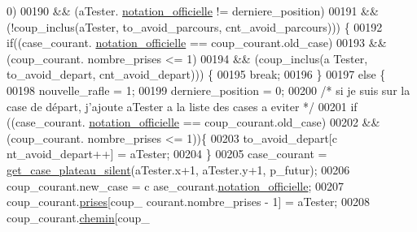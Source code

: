 \begin{DoxyCode}
       0)
00190                                                         && (aTester.
      \hyperlink{structcase__plateau_ad510581b324604a9cf685cbb769a421a}{notation_officielle} != derniere\_position)
00191                                                         && (!coup\_inclus(aTester,
       to\_avoid\_parcours, cnt\_avoid\_parcours))) \{
00192                                                 \textcolor{keywordflow}{if}((case\_courant.
      \hyperlink{structcase__plateau_ad510581b324604a9cf685cbb769a421a}{notation_officielle} == coup\_courant.old\_case)
00193                                                                 && (coup\_courant.
      nombre\_prises <= 1)
00194                                                                 && (coup\_inclus(a
      Tester, to\_avoid\_depart, cnt\_avoid\_depart))) \{
00195                                                         \textcolor{keywordflow}{break};
00196                                                 \}
00197                                                 \textcolor{keywordflow}{else} \{
00198                                                         nouvelle\_rafle = 1;
00199                                                         derniere\_position = 0;
00200                                                         \textcolor{comment}{/* si je suis sur la case
       de départ, j'ajoute aTester a la liste des cases a eviter */}
00201                                                         \textcolor{keywordflow}{if} ((case\_courant.
      \hyperlink{structcase__plateau_ad510581b324604a9cf685cbb769a421a}{notation_officielle} == coup\_courant.old\_case)
00202                                                                 && (coup\_courant.
      nombre\_prises <= 1))\{
00203                                                                 to\_avoid\_depart[c
      nt\_avoid\_depart++] = aTester;
00204                                                         \}
00205                                                         case\_courant = 
      \hyperlink{plateau_8h_a60a8f706865d0ae9087f8d65d4667655}{get_case_plateau_silent}(aTester.x+1, aTester.y+1, p\_futur);
00206                                                         coup\_courant.new\_case = c
      ase\_courant.\hyperlink{structcase__plateau_ad510581b324604a9cf685cbb769a421a}{notation_officielle};
00207                                                         coup\_courant.\hyperlink{structcoup_ae19b3a66d3f4e66b8f69a38e4005f44a}{prises}[coup\_
      courant.nombre\_prises - 1] = aTester;
00208                                                         coup\_courant.\hyperlink{structcoup_aa66b88eb8140c2f459ac92fad0796510}{chemin}[coup\_

\end{DoxyCode}
